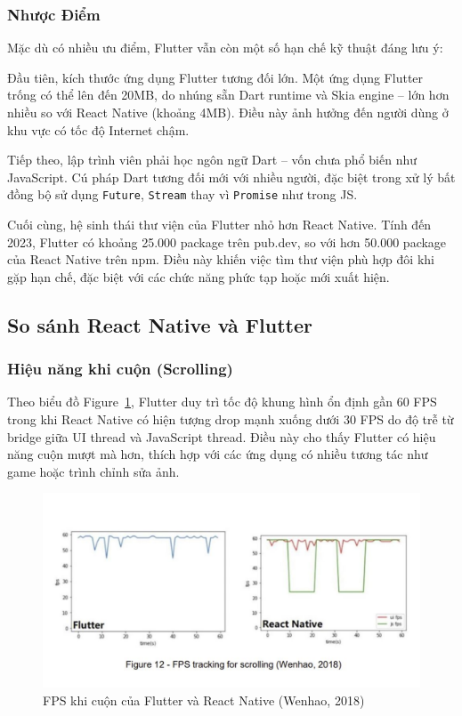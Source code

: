 \subsubsection{Nhược Điểm}

Mặc dù có nhiều ưu điểm, Flutter vẫn còn một số hạn chế kỹ thuật đáng lưu ý:

Đầu tiên, kích thước ứng dụng Flutter tương đối lớn.  
Một ứng dụng Flutter trống có thể lên đến 20MB, do nhúng sẵn Dart runtime và Skia engine – lớn hơn nhiều so với React Native (khoảng 4MB).  
Điều này ảnh hưởng đến người dùng ở khu vực có tốc độ Internet chậm.

Tiếp theo, lập trình viên phải học ngôn ngữ Dart – vốn chưa phổ biến như JavaScript.  
Cú pháp Dart tương đối mới với nhiều người, đặc biệt trong xử lý bất đồng bộ sử dụng \texttt{Future}, \texttt{Stream} thay vì \texttt{Promise} như trong JS.

Cuối cùng, hệ sinh thái thư viện của Flutter nhỏ hơn React Native.  
Tính đến 2023, Flutter có khoảng 25.000 package trên pub.dev, so với hơn 50.000 package của React Native trên npm.  
Điều này khiến việc tìm thư viện phù hợp đôi khi gặp hạn chế, đặc biệt với các chức năng phức tạp hoặc mới xuất hiện.

\subsection{So sánh React Native và Flutter}
\renewcommand{\labelitemi}{--}

\subsubsection{Hiệu năng khi cuộn (Scrolling)}
\begin{flushleft}
  \hspace*{0.8cm}Theo biểu đồ Figure~\ref{fig:scrolling}, Flutter duy trì tốc độ khung hình ổn định gần 60 FPS trong khi React Native có hiện tượng drop mạnh xuống dưới 30 FPS do độ trễ từ bridge giữa UI thread và JavaScript thread. Điều này cho thấy Flutter có hiệu năng cuộn mượt mà hơn, thích hợp với các ứng dụng có nhiều tương tác như game hoặc trình chỉnh sửa ảnh.
\end{flushleft}

\begin{figure}[H]
    \centering
    \includegraphics[width=0.8\linewidth]{images/scrolling.png}
    \caption{FPS khi cuộn của Flutter và React Native (Wenhao, 2018)}
    \label{fig:scrolling}
\end{figure}

